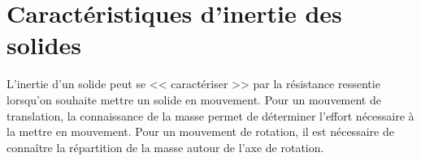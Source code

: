 %		
%
%
%
%
%
%
%
%
%




\section{Caractéristiques d'inertie des solides}
L'inertie d'un solide peut se << caractériser >> par la résistance ressentie lorsqu'on souhaite mettre un solide en mouvement. Pour un mouvement de translation, la connaissance de la masse permet de déterminer l'effort nécessaire à la mettre en mouvement. 
Pour un mouvement de rotation, il est nécessaire de connaître la répartition de la masse autour de l'axe de rotation.
%

